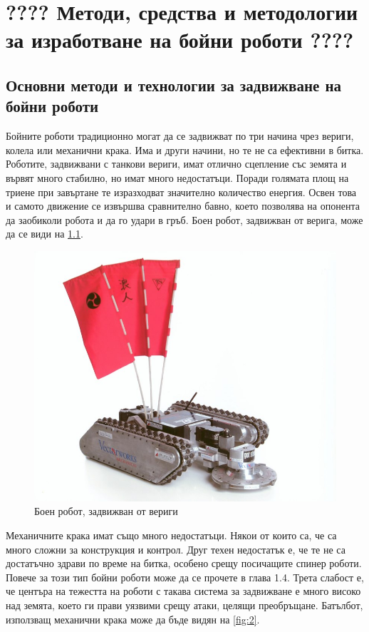 \chapter{\textbf{????} Методи, средства и методологии за изработване на бойни роботи \textbf{????}}


\section{Основни методи и технологии за задвижване на бойни роботи}

Бойните роботи традиционно могат да се задвижват по три начина чрез вериги, колела или механични крака. Има и други начини, но те не са ефективни в битка.
Роботите, задвижвани с танкови вериги, имат отлично сцепление със земята и вървят много стабилно, но имат много недостатъци. Поради голямата площ на триене при завъртане те изразходват значително количество енергия. Освен това и самото движение се извършва сравнително бавно, което позволява на опонента да заобиколи робота и да го удари в гръб. Боен робот, задвижван от верига, може да се види на \cref{fig:1}.

\begin{figure}[H]
    \centering
    \includegraphics[width=0.5\linewidth]{images/using-treads.jpg}
    
    \caption{Боен робот, задвижван от вериги}
    \label{fig:1} 
\end{figure}

Механичните крака имат също много недостатъци. Някои от които са, че са много сложни за конструкция и контрол. Друг техен недостатък е, че те не са достатъчно здрави по време на битка, особено срещу посичащите спинер роботи. Повече за този тип бойни роботи може да се прочете в глава 1.4. Трета слабост е, че центъра на тежестта на роботи с такава система за задвижване е много високо над земята, което ги прави уязвими срещу атаки, целящи преобръщане. Батълбот, използващ механични крака може да бъде видян на \cref{fig:2}.

